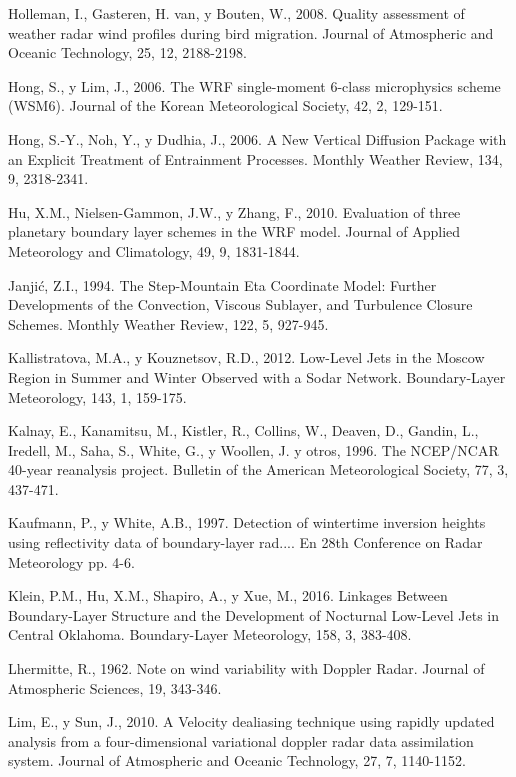 \documentclass[12pt,spanish,oneside, a4paper]{book}
\begin{document}
\hypertarget{ref-Holleman2008}{}
Holleman, I., Gasteren, H. van, y Bouten, W., 2008. Quality assessment
of weather radar wind profiles during bird migration. Journal of
Atmospheric and Oceanic Technology, 25, 12, 2188-2198.

\hypertarget{ref-Hong2006a}{}
Hong, S., y Lim, J., 2006. The WRF single-moment 6-class microphysics
scheme (WSM6). Journal of the Korean Meteorological Society, 42, 2,
129-151.

\hypertarget{ref-Hong2006}{}
Hong, S.-Y., Noh, Y., y Dudhia, J., 2006. A New Vertical Diffusion
Package with an Explicit Treatment of Entrainment Processes. Monthly
Weather Review, 134, 9, 2318-2341.

\hypertarget{ref-Hu2010}{}
Hu, X.M., Nielsen-Gammon, J.W., y Zhang, F., 2010. Evaluation of three
planetary boundary layer schemes in the WRF model. Journal of Applied
Meteorology and Climatology, 49, 9, 1831-1844.

\hypertarget{ref-Janjic1994}{}
Janjić, Z.I., 1994. The Step-Mountain Eta Coordinate Model: Further
Developments of the Convection, Viscous Sublayer, and Turbulence Closure
Schemes. Monthly Weather Review, 122, 5, 927-945.

\hypertarget{ref-Kallistratova2012}{}
Kallistratova, M.A., y Kouznetsov, R.D., 2012. Low-Level Jets in the
Moscow Region in Summer and Winter Observed with a Sodar Network.
Boundary-Layer Meteorology, 143, 1, 159-175.

\hypertarget{ref-Kalnay1996}{}
Kalnay, E., Kanamitsu, M., Kistler, R., Collins, W., Deaven, D., Gandin,
L., Iredell, M., Saha, S., White, G., y Woollen, J. y otros, 1996. The
NCEP/NCAR 40-year reanalysis project. Bulletin of the American
Meteorological Society, 77, 3, 437-471.

\hypertarget{ref-Kaufmann1997}{}
Kaufmann, P., y White, A.B., 1997. Detection of wintertime inversion
heights using reflectivity data of boundary-layer rad.... En 28th
Conference on Radar Meteorology pp. 4-6.

\hypertarget{ref-Klein2016}{}
Klein, P.M., Hu, X.M., Shapiro, A., y Xue, M., 2016. Linkages Between
Boundary-Layer Structure and the Development of Nocturnal Low-Level Jets
in Central Oklahoma. Boundary-Layer Meteorology, 158, 3, 383-408.

\hypertarget{ref-Lhermitte1962}{}
Lhermitte, R., 1962. Note on wind variability with Doppler Radar.
Journal of Atmospheric Sciences, 19, 343-346.

\hypertarget{ref-Lim2010}{}
Lim, E., y Sun, J., 2010. A Velocity dealiasing technique using rapidly
updated analysis from a four-dimensional variational doppler radar data
assimilation system. Journal of Atmospheric and Oceanic Technology, 27,
7, 1140-1152.
\end{document}
